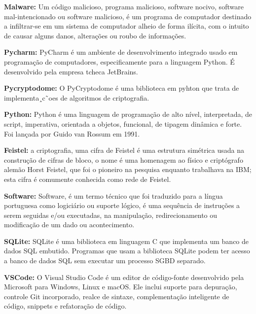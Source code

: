 \par \textbf{Malware:} Um código malicioso, programa malicioso, software nocivo, software mal-intencionado ou software malicioso, é um programa de computador destinado a infiltrar-se em um sistema de computador alheio de forma ilícita, com o intuito de causar alguns danos, alterações ou roubo de informações.

\par \textbf{Pycharm:} PyCharm é um ambiente de desenvolvimento integrado usado em programação de computadores, especificamente para a linguagem Python. É desenvolvido pela empresa tcheca JetBrains.

\par \textbf{Pycryptodome:} O PyCryptodome é uma biblioteca em pyhton que trata de implementa¸c˜oes de algoritmos de criptografia.

\par \textbf{Python:} Python é uma linguagem de programação de alto nível, interpretada, de script, imperativa, orientada a objetos, funcional, de tipagem dinâmica e forte. Foi lançada por Guido van Rossum em 1991.

\par \textbf{Feistel:} a criptografia, uma cifra de Feistel é uma estrutura simétrica usada na construção de cifras de bloco, o nome é uma homenagem ao físico e criptógrafo alemão Horst Feistel, que foi o pioneiro na pesquisa enquanto trabalhava na IBM; esta cifra é comumente conhecida como rede de Feistel.

\par \textbf{Software:} Software, é um termo técnico que foi traduzido para a língua portuguesa como logiciário ou suporte lógico, é uma sequência de instruções a serem seguidas e/ou executadas, na manipulação, redirecionamento ou modificação de um dado ou acontecimento.

\par \textbf{SQLite:} SQLite é uma biblioteca em linguagem C que implementa um banco de dados SQL embutido. Programas que usam a biblioteca SQLite podem ter acesso a banco de dados SQL sem executar um processo SGBD separado.

\par \textbf{VSCode:} O Visual Studio Code é um editor de código-fonte desenvolvido pela Microsoft para Windows, Linux e macOS. Ele inclui suporte para depuração, controle Git incorporado, realce de sintaxe, complementação inteligente de código, snippets e refatoração de código. 



